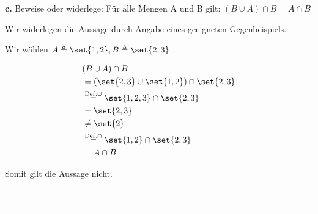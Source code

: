 \documentclass[10pt,leqno ]{article}
\DeclarePairedDelimiter\set\{\}
\newcommand\customeq[1]{\overset{\mathrm{#1}}{=}}
\theoremstyle{definition}
\newenvironment{solution}[1][L]{\begin{doublespace}\textbf{#1.}\quad }{\ \rule{0.5em}{0.5em}\end{doublespace}}
\begin{document}
\begin{solution}[c]
Beweise oder widerlege: Für alle Mengen A und B gilt: \( (B \cup A) \cap B = A \cap B \)

Wir widerlegen die Aussage durch Angabe eines geeigneten Gegenbeispiels.

Wir wählen \( A \triangleq \set{1,2}, B \triangleq \set{2,3} \).

\begin{align*}
    & (B \cup A) \cap B  \\
    &= (\set{2,3} \cup \set{1,2}) \cap \set{2,3}  \\
    & \customeq{Def. \cup} \set{1,2,3} \cap \set{2,3}  \\
    &= \set{2,3} \\
    & \neq \set{2}  \\
    & \customeq{Def. \cap} \set{1,2} \cap \set{2,3}  \\
    &= A \cap B \\
\end{align*}

Somit gilt die Aussage nicht.

\end{solution}
\end{document}
